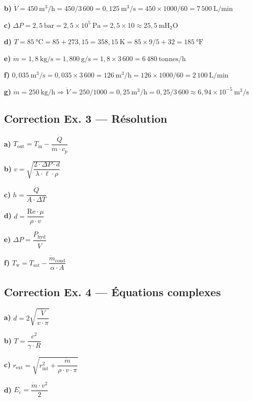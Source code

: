 \textbf{b)} $\dot{V} = 450~\mathrm{m^3/h} = 450 / 3\,600 = 0{,}125~\mathrm{m^3/s} = 450 \times 1000 / 60 = 7\,500~
\mathrm{L/min}$

\textbf{c)} $\Delta P = 2{,}5~\mathrm{bar} = 2{,}5 \times 10^5~\mathrm{Pa} = 2{,}5 \times 10 \approx 25{,}5~
\mathrm{mH_2O}$

\textbf{d)} $T = 85~\mathrm{°C} = 85 + 273{,}15 = 358{,}15~\mathrm{K} = 85 \times 9/5 + 32 = 185~\mathrm{°F}$

\textbf{e)} $\dot{m} = 1{,}8~\mathrm{kg/s} = 1{,}800~\mathrm{g/s} = 1{,}8 \times 3\,600 = 6\,480~\mathrm{tonnes/h}$

\textbf{f)} $0{,}035~\mathrm{m^3/s} = 0{,}035 \times 3\,600 = 126~\mathrm{m^3/h} = 126 \times 1000/60 = 2\,100~
\mathrm{L/min}$

\textbf{g)} $\dot{m} = 250~\mathrm{kg/h} \Rightarrow \dot{V} = 250/1000 = 0{,}25~\mathrm{m^3/h} = 0{,}25/3\,600 \approx
6{,}94 \times 10^{-5}~\mathrm{m^3/s}$

\subsection*{Correction Ex. 3 — Résolution}

\textbf{a)} $T_{\text{out}} = T_{\text{in}} - \dfrac{\dot{Q}}{\dot{m} \cdot c_p}$

\textbf{b)} $v = \sqrt{\dfrac{2 \cdot \Delta P \cdot d}{\lambda \cdot \ell \cdot \rho}}$

\textbf{c)} $h = \dfrac{\dot{Q}}{A \cdot \Delta T}$

\textbf{d)} $d = \dfrac{\mathrm{Re} \cdot \mu}{\rho \cdot v}$

\textbf{e)} $\Delta P = \dfrac{P_{\text{hyd}}}{\dot{V}}$

\textbf{f)} $T_{\text{w}} = T_{\text{sat}} - \dfrac{\dot{m}_{\text{cond}}}{\alpha \cdot A}$

\subsection*{Correction Ex. 4 — Équations complexes}

\textbf{a)} $d = 2 \sqrt{\dfrac{\dot{V}}{v \cdot \pi}}$

\textbf{b)} $T = \dfrac{c^2}{\gamma \cdot R}$

\textbf{c)} $r_{\text{ext}} = \sqrt{r_{\text{int}}^2 + \dfrac{\dot{m}}{\rho \cdot v \cdot \pi}}$

\textbf{d)} $E_c = \dfrac{\dot{m} \cdot v^2}{2}$

